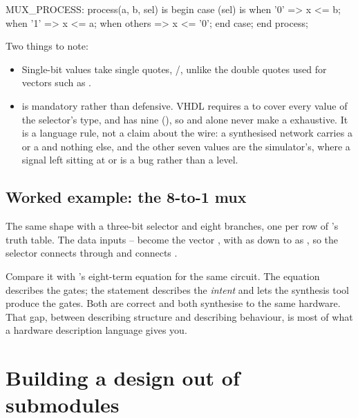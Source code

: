 \begin{vhdlcode}
MUX_PROCESS: process(a, b, sel) is
begin
    case (sel) is
        when '0'    => x <= b;
        when '1'    => x <= a;
        when others => x <= '0';
    end case;
end process;
\end{vhdlcode}

Two things to note:
\begin{itemize}
  \item Single-bit values take single quotes, /, unlike the double quotes used
    for vectors such as .
  \item {} is mandatory rather than defensive. VHDL requires a  to cover
    every value of the selector's type, and  has nine (), so
     and  alone never make a  exhaustive. It is a language rule, not
    a claim about the wire: a synthesised network carries a  or a  and nothing else,
    and the other seven values are the simulator's, where a signal left sitting at  or
     is a bug rather than a level.
\end{itemize}

\subsection*{Worked example: the 8-to-1 mux}
The same shape with a three-bit selector and eight branches, one per row of 's
truth table. The data inputs -- become the vector , with
 as  down to  as , so the selector 
connects  through and  connects .


Compare it with 's eight-term equation for the same circuit. The equation
describes the gates; the  statement describes the \emph{intent} and lets the synthesis
tool produce the gates. Both are correct and both synthesise to the same hardware. That gap,
between describing structure and describing behaviour, is most of what a hardware description
language gives you.

\section{Building a design out of submodules}
\label{c2:sec:submodules}

